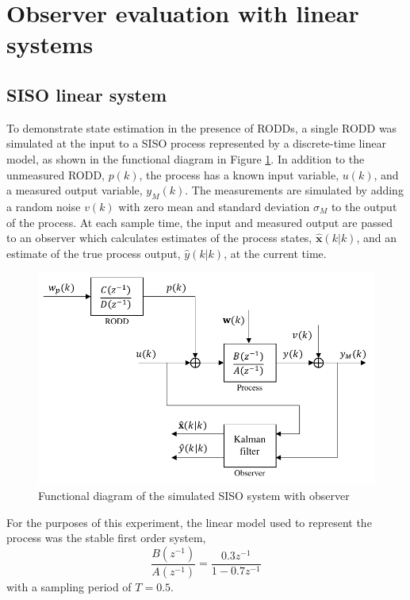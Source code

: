 \section{Observer evaluation with linear systems} \label{section:sim-obs-lin}

\subsection{SISO linear system} \label{sim-obs-lin-1}

To demonstrate state estimation in the presence of \gls{RODD}s, a single \gls{RODD} was simulated at the input to a SISO process represented by a discrete-time linear model, as shown in the functional diagram in Figure \ref{fig:sim-sys-diag-siso}. In addition to the unmeasured \gls{RODD}, $p(k)$, the process has a known input variable, $u(k)$, and a measured output variable, $y_M(k)$. The measurements are simulated by adding a random noise $v(k)$ with zero mean and standard deviation $\sigma_M$ to the output of the process. At each sample time, the input and measured output are passed to an observer which calculates estimates of the process states, $\hat{\mathbf{x}}(k|k)$, and an estimate of the true process output, $\hat{y}(k|k)$, at the current time.
\begin{figure}[htp]
	\centering
	\includegraphics[width=11.5cm]{images/sim-sys-diag-siso.pdf}
	\caption{Functional diagram of the simulated SISO system with observer}
	\label{fig:sim-sys-diag-siso}
\end{figure}

For the purposes of this experiment, the linear model used to represent the process was the stable first order system,
\begin{equation}
	\frac{B(z^{-1})}{A(z^{-1})} = \frac{0.3z^{-1}}{1-0.7z^{-1}}
\end{equation}
with a sampling period of $T=0.5$.

